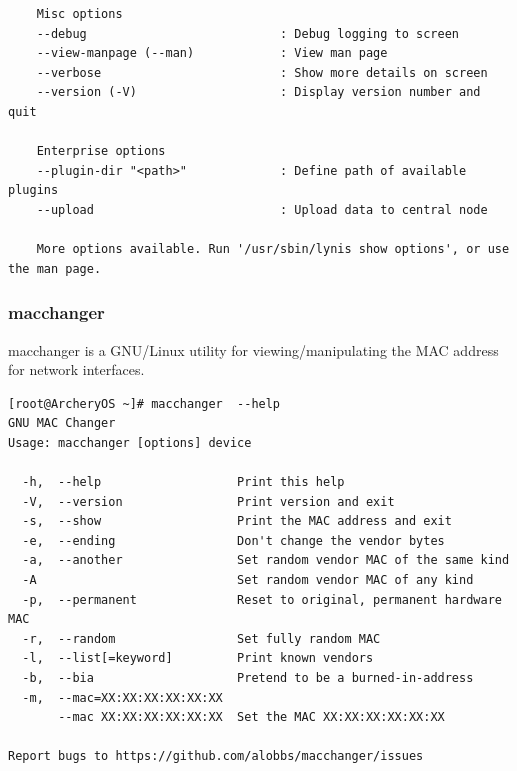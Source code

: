 \documentclass{article}
\begin{document}
\begin{lstlisting}
    Misc options
    --debug                           : Debug logging to screen
    --view-manpage (--man)            : View man page
    --verbose                         : Show more details on screen
    --version (-V)                    : Display version number and quit

    Enterprise options
    --plugin-dir "<path>"             : Define path of available plugins
    --upload                          : Upload data to central node

    More options available. Run '/usr/sbin/lynis show options', or use the man page.
\end{lstlisting}

\subsubsection{macchanger}
macchanger  is  a  GNU/Linux  utility  for viewing/manipulating the MAC address for network interfaces.
\begin{lstlisting}
[root@ArcheryOS ~]# macchanger  --help
GNU MAC Changer
Usage: macchanger [options] device

  -h,  --help                   Print this help
  -V,  --version                Print version and exit
  -s,  --show                   Print the MAC address and exit
  -e,  --ending                 Don't change the vendor bytes
  -a,  --another                Set random vendor MAC of the same kind
  -A                            Set random vendor MAC of any kind
  -p,  --permanent              Reset to original, permanent hardware MAC
  -r,  --random                 Set fully random MAC
  -l,  --list[=keyword]         Print known vendors
  -b,  --bia                    Pretend to be a burned-in-address
  -m,  --mac=XX:XX:XX:XX:XX:XX
       --mac XX:XX:XX:XX:XX:XX  Set the MAC XX:XX:XX:XX:XX:XX

Report bugs to https://github.com/alobbs/macchanger/issues
\end{lstlisting}
\end{document}

